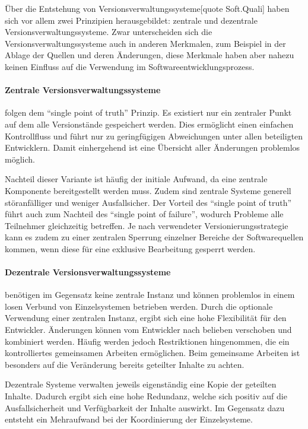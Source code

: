 Über die Entstehung von Versionsverwaltungssysteme[quote Soft.Quali] haben sich vor allem zwei Prinzipien herausgebildet: 
zentrale und dezentrale Versionsverwaltungssysteme. Zwar unterscheiden sich die Versionsverwaltungssysteme auch in 
anderen Merkmalen, zum Beispiel in der Ablage der Quellen und deren Änderungen, diese Merkmale haben aber nahezu keinen 
Einfluss auf die Verwendung im Softwareentwicklungsprozess.

\paragraph{Zentrale Versionsverwaltungssysteme} folgen dem ``single point of truth'' Prinzip. Es existiert nur ein 
zentraler Punkt auf dem alle Versionstände gespeichert werden. Dies ermöglicht einen einfachen Kontrollfluss und führt nur zu geringfügigen Abweichungen unter allen beteiligten Entwicklern. Damit einhergehend ist eine Übersicht aller Änderungen problemlos möglich.

Nachteil dieser Variante ist häufig der initiale Aufwand, da eine zentrale Komponente bereitgestellt werden muss. Zudem 
sind zentrale Systeme generell störanfälliger und weniger Ausfallsicher. Der Vorteil des ``single point of truth'' führt 
auch zum Nachteil des ``single point of failure'', wodurch Probleme alle Teilnehmer gleichzeitig betreffen.
Je nach verwendeter Versionierungsstrategie kann es zudem zu einer zentralen Sperrung einzelner Bereiche der Softwarequellen kommen, wenn diese für eine exklusive Bearbeitung gesperrt werden.

\paragraph{Dezentrale Versionsverwaltungssysteme} benötigen im Gegensatz keine zentrale Instanz und können problemlos in 
einem losen Verbund von Einzelsystemen betrieben werden. 
Durch die optionale Verwendung einer zentralen Instanz, ergibt sich eine hohe Flexibilität für den Entwickler. Änderungen 
können vom Entwickler nach belieben verschoben und kombiniert werden.
Häufig werden jedoch Restriktionen hingenommen, die ein kontrolliertes gemeinsamen Arbeiten ermöglichen. Beim gemeinsame 
Arbeiten ist besonders auf die Veränderung bereits geteilter Inhalte zu achten.
 
Dezentrale Systeme verwalten jeweils eigenständig eine Kopie der geteilten Inhalte. Dadurch ergibt sich eine hohe 
Redundanz, welche sich positiv auf die Ausfallsicherheit und Verfügbarkeit der Inhalte auswirkt. Im Gegensatz dazu 
entsteht ein Mehraufwand bei der Koordinierung der Einzelsysteme.


